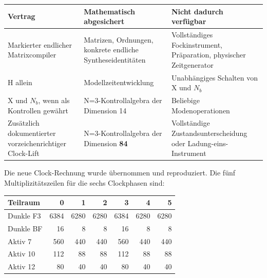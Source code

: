 {\def\LTcaptype{none} %
\begin{longtable}[]{@{}
  >{\raggedright\arraybackslash}p{}
  >{\raggedright\arraybackslash}p{}
  >{\raggedright\arraybackslash}p{}@{}}
\toprule\noalign{}
\begin{minipage}[b]{\linewidth}\raggedright
Vertrag
\end{minipage} & \begin{minipage}[b]{\linewidth}\raggedright
Mathematisch abgesichert
\end{minipage} & \begin{minipage}[b]{\linewidth}\raggedright
Nicht dadurch verfügbar
\end{minipage} \\
\midrule\noalign{}
\endhead
\bottomrule\noalign{}
\endlastfoot
Markierter endlicher Matrixcompiler & Matrizen, Ordnungen, konkrete
endliche Syntheseidentitäten & Vollständiges Fockinstrument,
Präparation, physischer Zeitgenerator \\
H allein & Modellzeitentwicklung & Unabhängiges Schalten von X und
\(N_b\) \\
X und \(N_b\), wenn als Kontrollen gewährt & N=3-Kontrollalgebra der
Dimension 14 & Beliebige Modenoperationen \\
Zusätzlich dokumentierter vorzeichenrichtiger Clock-Lift &
N=3-Kontrollalgebra der Dimension \textbf{84} & Vollständige
Zustandsunterscheidung oder Ladung-eins-Instrument \\
\end{longtable}
}

Die neue Clock-Rechnung wurde übernommen und reproduziert. Die fünf
Multiplizitätszeilen für die sechs Clockphasen sind:

{\def\LTcaptype{none} %
\begin{longtable}[]{@{}lrrrrrr@{}}
\toprule\noalign{}
Teilraum & 0 & 1 & 2 & 3 & 4 & 5 \\
\midrule\noalign{}
\endhead
\bottomrule\noalign{}
\endlastfoot
Dunkle F3 & 6384 & 6280 & 6280 & 6384 & 6280 & 6280 \\
Dunkle BF & 16 & 8 & 8 & 16 & 8 & 8 \\
Aktiv 7 & 560 & 440 & 440 & 560 & 440 & 440 \\
Aktiv 10 & 112 & 88 & 88 & 112 & 88 & 88 \\
Aktiv 12 & 80 & 40 & 40 & 80 & 40 & 40 \\
\end{longtable}
}

